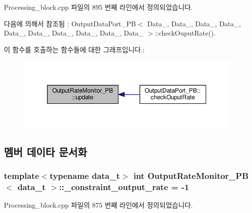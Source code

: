 Processing\+\_\+block.\+cpp 파일의 895 번째 라인에서 정의되었습니다.



다음에 의해서 참조됨 \+:  Output\+Data\+Port\+\_\+\+P\+B$<$ Data\+\_, Data\+\_, Data\+\_, Data\+\_, Data\+\_, Data\+\_, Data\+\_, Data\+\_, Data\+\_, Data\+\_ $>$\+::check\+Ouput\+Rate().



이 함수를 호출하는 함수들에 대한 그래프입니다.\+:\nopagebreak
\begin{figure}[H]
\begin{center}
\leavevmode
\includegraphics[width=344pt]{classOutputRateMonitor__PB_aa7cb6d5f781c0c8f184f77ff75165551_icgraph}
\end{center}
\end{figure}




\subsection{멤버 데이타 문서화}
\subsubsection[{\texorpdfstring{\+\_\+constraint\+\_\+output\+\_\+rate}{_constraint_output_rate}}]{\setlength{\rightskip}{0pt plus 5cm}template$<$typename data\+\_\+t$>$ int {\bf Output\+Rate\+Monitor\+\_\+\+PB}$<$ data\+\_\+t $>$\+::\+\_\+constraint\+\_\+output\+\_\+rate = -\/1\hspace{0.3cm}{\ttfamily [private]}}\hypertarget{classOutputRateMonitor__PB_a5743656477250ee9c8ad90bbfa3f6bbd}{}\label{classOutputRateMonitor__PB_a5743656477250ee9c8ad90bbfa3f6bbd}


Processing\+\_\+block.\+cpp 파일의 875 번째 라인에서 정의되었습니다.


